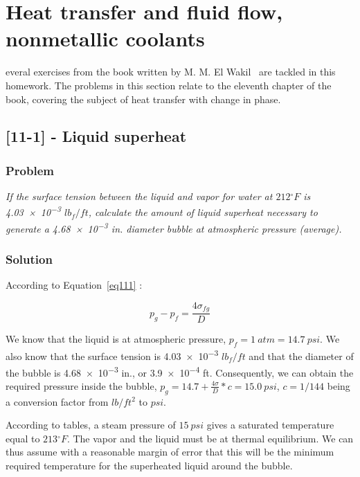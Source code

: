 %
%
\let\textcircled=\pgftextcircled
\chapter{Heat transfer and fluid flow, nonmetallic coolants}
\label{chap:intro}

everal exercises from the book written by M. M. El Wakil~\cite{book01} are tackled in this homework. The problems in this section relate to the eleventh chapter of the book, covering the subject of heat transfer with change in phase.

\section{[11-1] - Liquid superheat}
\label{prob101}


\subsection{Problem}
\textit{If the surface tension between the liquid and vapor for water at $212{}^\circ F$ is \num{4.03e-3} $lb_f/ft$, calculate the amount of liquid superheat necessary to generate a \num{4.68e-3} in. diameter bubble at atmospheric pressure (average).}

\subsection{Solution}


According to Equation~\ref{eq111} :

\begin{equation}\label{eq111}
p_g - p_f = \frac{4\sigma_{fg}}{D}
\end{equation}

We know that the liquid is at atmospheric pressure, $p_f = 1\ atm = 14.7\ psi$. We also know that the surface tension is \num{4.03e-3} $lb_f/ft$ and that the diameter of the bubble is \num{4.68e-3} in., or \num{3.9e-4} ft. Consequently, we can obtain the required pressure inside the bubble, $p_g = 14.7 + \frac{4\sigma}{D} * c = 15.0\ psi$, $c = 1/144$ being a conversion factor from $lb/ft^2$ to $psi$.


According to tables, a steam pressure of $15\ psi$ gives a saturated temperature equal to $213{}^\circ F$. The vapor and the liquid must be at thermal equilibrium. We can thus assume with a reasonable margin of error that this will be the minimum required temperature for the superheated liquid around the bubble.

